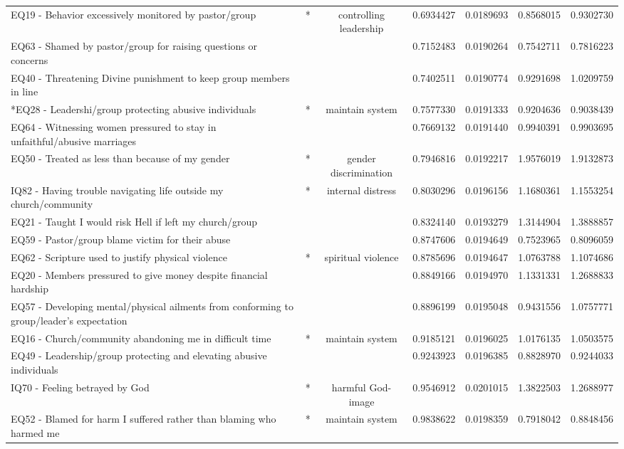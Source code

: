 \documentclass[
]{article}
\begin{document}
\begin{longtable}[t]{>{\raggedright\arraybackslash}p{11cm}cccccc}
*EQ19 - Behavior excessively monitored by pastor/group & * & controlling leadership & 0.6934427 & 0.0189693 & 0.8568015 & 0.9302730\\
EQ63 - Shamed by pastor/group for raising questions or concerns &  &  & 0.7152483 & 0.0190264 & 0.7542711 & 0.7816223\\
EQ40 - Threatening Divine punishment to keep group members in line &  &  & 0.7402511 & 0.0190774 & 0.9291698 & 1.0209759\\
\addlinespace
*EQ28 - Leadershi/group protecting abusive individuals & * & maintain system & 0.7577330 & 0.0191333 & 0.9204636 & 0.9038439\\
EQ64 - Witnessing women pressured to stay in unfaithful/abusive marriages &  &  & 0.7669132 & 0.0191440 & 0.9940391 & 0.9903695\\
EQ50 - Treated as less than because of my gender & * & gender discrimination & 0.7946816 & 0.0192217 & 1.9576019 & 1.9132873\\
*IQ82 - Having trouble navigating life outside my church/community & * & internal distress & 0.8030296 & 0.0196156 & 1.1680361 & 1.1553254\\
EQ21 - Taught I would risk Hell if left my church/group &  &  & 0.8324140 & 0.0193279 & 1.3144904 & 1.3888857\\
\addlinespace
EQ59 - Pastor/group blame victim for their abuse &  &  & 0.8747606 & 0.0194649 & 0.7523965 & 0.8096059\\
*EQ62 - Scripture used to justify physical violence & * & spiritual violence & 0.8785696 & 0.0194647 & 1.0763788 & 1.1074686\\
EQ20 - Members pressured to give money despite financial hardship &  &  & 0.8849166 & 0.0194970 & 1.1331331 & 1.2688833\\
EQ57 - Developing mental/physical ailments from conforming to group/leader’s expectation &  &  & 0.8896199 & 0.0195048 & 0.9431556 & 1.0757771\\
*EQ16 - Church/community abandoning me in difficult time & * & maintain system & 0.9185121 & 0.0196025 & 1.0176135 & 1.0503575\\
\addlinespace
EQ49 - Leadership/group protecting and elevating abusive individuals &  &  & 0.9243923 & 0.0196385 & 0.8828970 & 0.9244033\\
*IQ70 - Feeling betrayed by God & * & harmful God-image & 0.9546912 & 0.0201015 & 1.3822503 & 1.2688977\\
*EQ52 - Blamed for harm I suffered rather than blaming who harmed me & * & maintain system & 0.9838622 & 0.0198359 & 0.7918042 & 0.8848456\\

\end{longtable}
\end{document}
